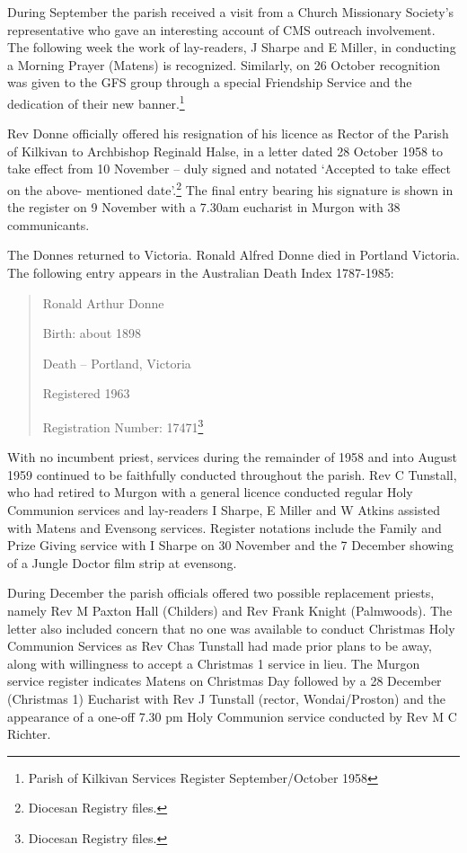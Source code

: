During September the parish received a visit from a Church Missionary
Society's representative who gave an interesting account of CMS outreach
involvement. The following week the work of lay-readers, J Sharpe and E
Miller, in conducting a Morning Prayer (Matens) is recognized.
Similarly, on 26 October recognition was given to the GFS group through
a special Friendship Service and the dedication of their new
banner.\footnote{Parish of Kilkivan Services Register September/October
  1958}

Rev Donne officially offered his resignation of his licence as Rector of
the Parish of Kilkivan to Archbishop Reginald Halse, in a letter dated
28 October 1958 to take effect from 10 November -- duly signed and
notated `Accepted to take effect on the above- mentioned
date'.\footnote{Diocesan Registry files.} The final entry bearing his
signature is shown in the register on 9 November with a 7.30am eucharist
in Murgon with 38 communicants.

The Donnes returned to Victoria. Ronald Alfred Donne died in Portland
Victoria. The following entry appears in the Australian Death Index
1787-1985:

\begin{quote}
Ronald Arthur Donne

Birth: about 1898

Death -- Portland, Victoria

Registered 1963

Registration Number: 17471\footnote{Diocesan Registry files.}
\end{quote}

With no incumbent priest, services during the remainder of 1958 and into
August 1959 continued to be faithfully conducted throughout the parish.
Rev C Tunstall, who had retired to Murgon with a general licence
conducted regular Holy Communion services and lay-readers I Sharpe, E
Miller and W Atkins assisted with Matens and Evensong services. Register
notations include the Family and Prize Giving service with I Sharpe on
30 November and the 7 December showing of a Jungle Doctor film strip at
evensong.

During December the parish officials offered two possible replacement
priests, namely Rev M Paxton Hall (Childers) and Rev Frank Knight
(Palmwoods). The letter also included concern that no one was available
to conduct Christmas Holy Communion Services as Rev Chas Tunstall had
made prior plans to be away, along with willingness to accept a
Christmas 1 service in lieu. The Murgon service register indicates
Matens on Christmas Day followed by a 28 December (Christmas 1)
Eucharist with Rev J Tunstall (rector, Wondai/Proston) and the
appearance of a one-off 7.30 pm Holy Communion service conducted by Rev
M C Richter.

